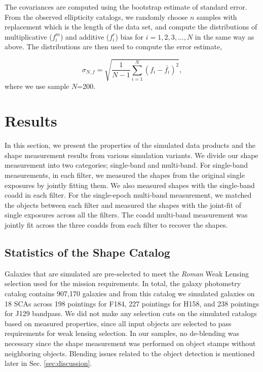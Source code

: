 \documentclass[fleqn,usenatbib]{mnras}
\begin{document}
The covariances are computed using the bootstrap estimate of standard error. From the observed ellipticity catalogs, we randomly choose $n$ samples with replacement which is the length of the data set, and compute the distributions of multiplicative ($f^{m}_{i}$) and additive ($f^{c}_{i}$) bias for $i=1,2,3,...,N$ in the same way as above. The distributions are then used to compute the error estimate,  


\begin{equation}
    \sigma_{N,f} = \sqrt{\frac{1}{N-1} \sum_{i=1}^{N}(f_{i}-\bar{f_{i}})^{2}}, 
\end{equation}
where we use sample $N$=200.


\section{Results}
\label{sec:results}
In this section, we present the properties of the simulated data products and the shape measurement results from various simulation variants. We divide our shape measurement into two categories; single-band and multi-band. For single-band measurements, in each filter, we measured the shapes from the original single exposures by jointly fitting them. We also measured shapes with the single-band coadd in each filter. For the single-epoch multi-band measurement, we matched the objects between each filter and measured the shapes with the joint-fit of single exposures across all the filters. The coadd multi-band measurement was jointly fit across the three coadds from each filter to recover the shapes. 

\subsection{Statistics of the Shape Catalog}
Galaxies that are simulated are pre-selected to meet the \emph{Roman} Weak Lensing selection used for the mission requirements. In total, the galaxy photometry catalog contains 907,170 galaxies and from this catalog we simulated galaxies on 18 SCAs across 198 pointings for F184, 227 pointings for H158, and 238 pointings for J129 bandpass. We did not make any selection cuts on the simulated catalogs based on measured properties, since all input objects are selected to pass requirements for weak lensing selection. In our samples, no de-blending was necessary since the shape measurement was performed on object stamps without neighboring objects. Blending issues related to the object detection is mentioned later in Sec. \ref{sec:discussion}. 
\end{document}
